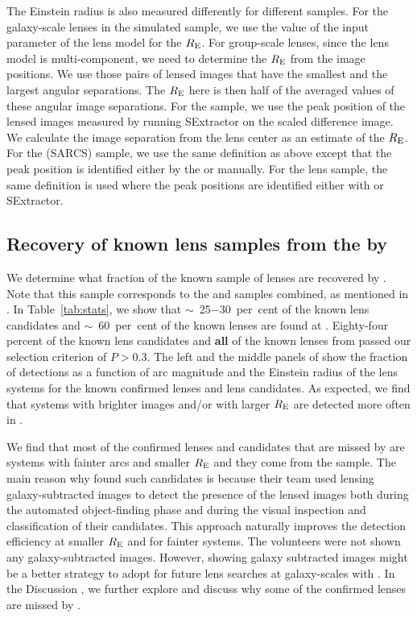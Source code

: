 \documentclass[useAMS,usenatbib,a4paper]{mn2e}
\begin{document}
The Einstein radius is also measured differently for
different samples. For the galaxy-scale lenses in the simulated sample,
we use the value of the input parameter of the lens model for the $R_{\rm E}$.
For group-scale lenses, since the lens model is multi-component, we
need to determine the $R_{\rm E}$ from the image positions. We use those
pairs of lensed images that have the smallest and the largest angular
separations. The $R_{\rm E}$ here is then half of the averaged values of
these angular image separations. For the \rf sample, we use the peak
position of the lensed images measured by running {\sc SExtractor} on
the scaled difference image. We calculate the image separation from the
lens center as an estimate of the $R_{\rm E}$. For the \af (SARCS)
sample, we use the same definition as above except that the peak
position is identified either by the \af or manually. For the \sw lens
sample, the same definition is used where the peak positions are
identified either with \af or {\sc SExtractor}.



\subsection{Recovery of known lens samples from the \cfhtls by \sw}
\label{sec:results:known}

We determine what fraction of the known sample of lenses are recovered
by \sw. Note that this sample corresponds to the \rf and \af samples
combined, as mentioned in . In Table~\ref{tab:stats},
we show that $\sim$~25$-$30~per~cent of the known lens candidates and
$\sim$~60~per~cent of the known lenses are found at \StageOne. Eighty-four
percent of the known lens candidates and \textbf{all} of the known lenses
from \StageOne passed our \StageTwo selection criterion of $P>0.3$.
The left and the middle panels of  show the
fraction of detections as a function of arc magnitude and the Einstein
radius of the lens systems for the known confirmed lenses and lens
candidates. As expected, we find that systems with brighter images
and/or with larger $R_{\rm E}$ are detected more often in \sw.

We find that most of the confirmed lenses and candidates that are missed
by \sw are systems with fainter arcs and smaller $R_{\rm E}$ and they
come from the \rf sample. The main reason why \rf found such candidates
is because their team used lensing galaxy-subtracted images to detect
the presence of the lensed images both during the automated
object-finding phase and during the visual inspection and classification
of their candidates. This approach naturally improves the detection
efficiency at smaller $R_{\rm E}$ and for fainter systems. The \sw
volunteers were not shown any galaxy-subtracted images. However, showing
galaxy subtracted images might be a better strategy to adopt for future
lens searches at galaxy-scales with \sw. In the Discussion
, we further explore and discuss why some of the confirmed
lenses are missed by \sw.
\end{document}
